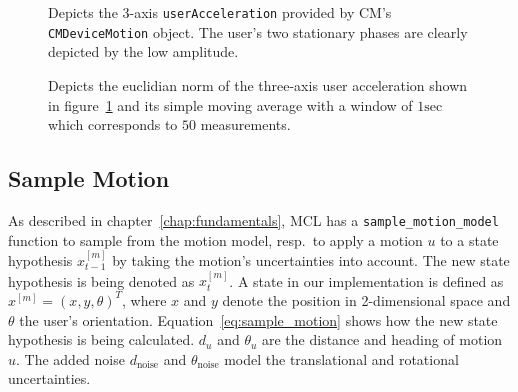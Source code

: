\begin{figure}
\caption{Depicts the 3-axis \texttt{userAcceleration} provided by \acs{CM}'s \texttt{CMDeviceMotion} object. The user's two stationary phases are clearly depicted by the low amplitude.}
\label{fig:mm_stationary_1}
\end{figure}

\begin{figure}
\caption{Depicts the euclidian norm of the three-axis user acceleration shown in figure~\ref{fig:mm_stationary_1} and its simple moving average with a window of $1 \text{sec}$ which corresponds to $50$ measurements.}
\label{fig:mm_stationary_2}
\end{figure}



\subsection{Sample Motion}\label{sec:algo_sample_motion}
As described in chapter~\ref{chap:fundamentals}, \acs{MCL} has a \texttt{sample\_motion\_model} function to sample from the motion model, resp.\ to apply a motion $u$ to a state hypothesis $x^{[m]}_{t-1}$ by taking the motion's uncertainties into account. The new state hypothesis is being denoted as $x^{[m]}_t$. A state in our implementation is defined as $x^{[m]} = (x, y, \theta)^T$, where $x$ and $y$ denote the position in 2-dimensional space and $\theta$ the user's orientation. Equation~\ref{eq:sample_motion} shows how the new state hypothesis is being calculated. $d_u$ and $\theta_u$ are the distance and heading of motion $u$. The added noise $d_\text{noise}$ and $\theta_\text{noise}$ model the translational and rotational uncertainties.

